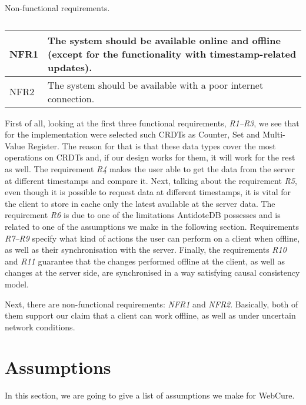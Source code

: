\begin{table}[!htbp]
\centering
\caption{Non-functional requirements.}
\label{table:req2}
\begin{tabular}{|p{1cm}|p{14cm}|}
\hline
NFR1 & The system should be available online and offline (except for the functionality with timestamp-related updates). \\ \hline
NFR2 & The system should be available with a poor internet connection. \\ \hline
\end{tabular}
\caption*{}
\end{table} 

First of all, looking at the first three functional requirements, \textit{R1--R3}, we see that for the implementation were selected such CRDTs as Counter, Set and Multi-Value Register. The reason for that is that these data types cover the most operations on CRDTs and, if our design works for them, it will work for the rest as well. The requirement \textit{R4} makes the user able to get the data from the server at different timestamps and compare it. Next, talking about the requirement \textit{R5}, even though it is possible to request data at different timestamps, it is vital for the client to store in cache only the latest available at the server data. The requirement \textit{R6} is due to one of the limitations AntidoteDB possesses and is related to one of the assumptions we make in the following section. Requirements \textit{R7--R9} specify what kind of actions the user can perform on a client when offline, as well as their synchronisation with the server. Finally, the requirements \textit{R10} and \textit{R11} guarantee that the changes performed offline at the client, as well as changes at the server side, are synchronised in a way satisfying causal consistency model. 

Next, there are non-functional requirements: \textit{NFR1} and \textit{NFR2}. Basically, both of them support our claim that a client can work offline, as well as under uncertain network conditions. 

\section{Assumptions}
\label{4-Assumptions}

In this section, we are going to give a list of assumptions we make for WebCure. 

